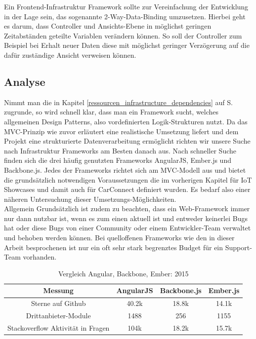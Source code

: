 \documentclass[12pt,a4paper,oneside, 
liststotoc, 					%
bibtotoc,						%
titlepage, 						%
headsepline, 					%
BCOR6mm,						%
openany,							%
]{scrreprt}
\begin{document}
Ein Frontend-Infrastruktur Framework sollte zur Vereinfachung der Entwicklung in der Lage sein, das sogenannte 2-Way-Data-Binding umzusetzen. Hierbei geht es darum, dass Controller und Ansichts-Ebene in möglichst geringen Zeitabständen geteilte Variablen verändern können. So soll der Controller zum Beispiel bei Erhalt neuer Daten diese mit möglichst geringer Verzögerung auf die dafür zuständige Ansicht verweisen können. 
  \subsection{Analyse}\label{ressourcen_infrastructure_analysis}
  Nimmt man die in Kapitel \ref{ressourcen_infrastructure_dependencies} auf S.\pageref{ressourcen_infrastructure_dependencies} zugrunde, so wird schnell klar, dass man ein Framework sucht, welches allgemeinen Design Patterns, also vordefinierten Logik-Strukturen nutzt. Da das MVC-Prinzip wie zuvor erläutert eine realistische Umsetzung liefert und dem Projekt eine strukturierte Datenverarbeitung ermöglicht richten wir unsere Suche nach Infrastruktur Frameworks am Besten danach aus. Nach schneller Suche finden sich die drei häufig genutzten Frameworks AngularJS, Ember.js und Backbone.js. Jedes der Frameworks richtet sich am MVC-Modell aus und bietet die grundsätzlich notwendigen Voraussetzungen die im vorherigen Kapitel für IoT Showcases und damit auch für CarConnect definiert wurden. Es bedarf also einer näheren Untersuchung dieser Umsetzungs-Möglichkeiten. \\
  Allgemein Grundsätzlich ist zudem zu beachten, dass ein Web-Framework immer nur dann nutzbar ist, wenn es zum einen aktuell ist und entweder keinerlei Bugs hat oder diese Bugs von einer Community oder einem Entwickler-Team verwaltet und behoben werden können. Bei quelloffenen Frameworks wie den in dieser Arbeit besprochenen ist nur ein oft sehr stark begrenztes Budget für ein Support-Team vorhanden. 
  \begin{table}[h]
 \begin{tabular}{|c|c|c|c|}
 \hline
  Messung & AngularJS & Backbone.js & Ember.js \\
  \hline
  Sterne auf Github & 40.2k & 18.8k & 14.1k \\
  \hline
  Drittanbieter-Module & 1488 & 256 & 1155 \\
  \hline
  Stackoverflow Aktivität in Fragen & 104k & 18.2k & 15.7k \\
  \hline
 \end{tabular}
 \label{tab:infrastructure}
 \caption{Vergleich Angular, Backbone, Ember: 2015}
 \end{table}
\end{document}
